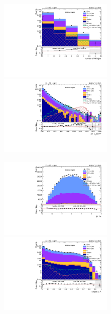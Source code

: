 
\begin{figure}[!htb]
  \begin{center}
    \includegraphics[width=0.495\textwidth]{plots/v9_thesis/XVZnnInc/nFatJets.pdf}  
    \includegraphics[width=0.495\textwidth]{plots/v9_thesis/XVZnnInc/FatJet1_pt.pdf}
    
    \includegraphics[width=0.495\textwidth]{plots/v9_thesis/XVZnnInc/FatJet1_eta.pdf}
    \includegraphics[width=0.495\textwidth]{plots/v9_thesis/XVZnnInc/FatJet1_dR.pdf}


\end{center}
\end{figure}
